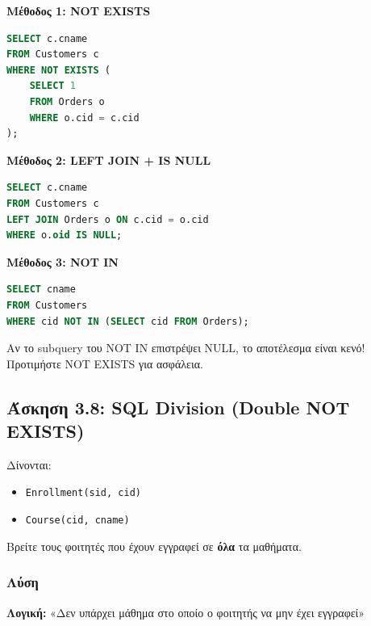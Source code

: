 \textbf{Μέθοδος 1: NOT EXISTS}

\begin{lstlisting}[language=SQL]
SELECT c.cname
FROM Customers c
WHERE NOT EXISTS (
    SELECT 1
    FROM Orders o
    WHERE o.cid = c.cid
);
\end{lstlisting}

\textbf{Μέθοδος 2: LEFT JOIN + IS NULL}

\begin{lstlisting}[language=SQL]
SELECT c.cname
FROM Customers c
LEFT JOIN Orders o ON c.cid = o.cid
WHERE o.oid IS NULL;
\end{lstlisting}

\textbf{Μέθοδος 3: NOT IN}

\begin{lstlisting}[language=SQL]
SELECT cname
FROM Customers
WHERE cid NOT IN (SELECT cid FROM Orders);
\end{lstlisting}

\begin{warningbox}
Αν το subquery του NOT IN επιστρέψει NULL, το αποτέλεσμα είναι κενό!
Προτιμήστε NOT EXISTS για ασφάλεια.
\end{warningbox}

\subsection{Άσκηση 3.8: SQL Division (Double NOT EXISTS)}

\begin{formulabox}[Εκφώνηση]
Δίνονται:
\begin{itemize}
    \item \texttt{Enrollment(sid, cid)}
    \item \texttt{Course(cid, cname)}
\end{itemize}

Βρείτε τους φοιτητές που έχουν εγγραφεί σε \textbf{όλα} τα μαθήματα.
\end{formulabox}

\subsubsection*{Λύση}

\textbf{Λογική:} «Δεν υπάρχει μάθημα στο οποίο ο φοιτητής να μην έχει εγγραφεί»

